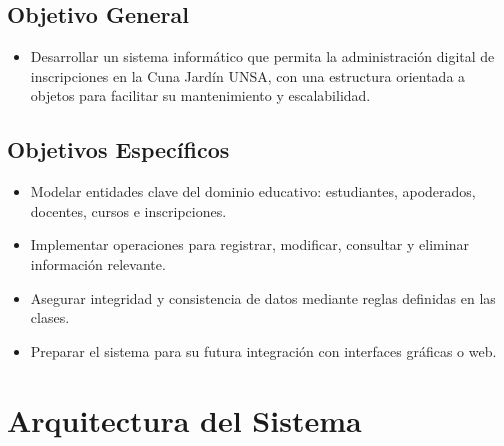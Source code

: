 \documentclass{article}
\begin{document}
    \subsection{Objetivo General}
        \begin{itemize}
            \item Desarrollar un sistema informático que permita la administración digital de inscripciones en la Cuna
            Jardín UNSA, con una estructura orientada a objetos para facilitar su mantenimiento y escalabilidad.
        \end{itemize}
    \subsection{Objetivos Específicos}
        \begin{itemize}
            \item Modelar entidades clave del dominio educativo: estudiantes, apoderados, docentes, cursos e inscripciones.
            \item Implementar operaciones para registrar, modificar, consultar y eliminar información relevante.
            \item Asegurar integridad y consistencia de datos mediante reglas definidas en las clases.
            \item Preparar el sistema para su futura integración con interfaces gráficas o web.
        \end{itemize}

\section{Arquitectura del Sistema}
\end{document}
